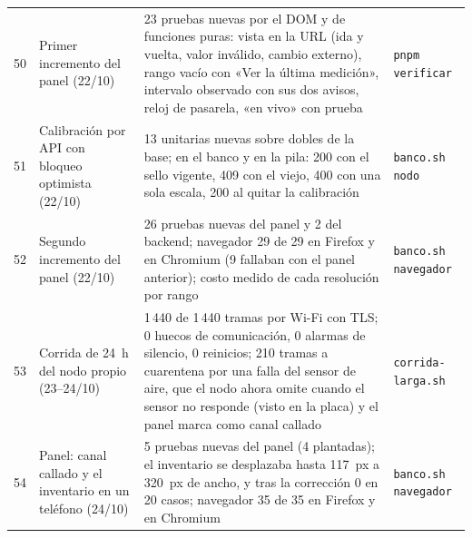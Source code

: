 \begin{longtable}{@{}L{0.8cm}L{3.2cm}L{4.2cm}L{3.8cm}@{}}
50 & Primer incremento del panel (22/10) & 23 pruebas nuevas por el DOM y de funciones puras: vista en la URL (ida y vuelta, valor inválido, cambio externo), rango vacío con «Ver la última medición», intervalo observado con sus dos avisos, reloj de pasarela, «en vivo» con prueba & \texttt{pnpm verificar} \\
51 & Calibración por API con bloqueo optimista (22/10) & 13 unitarias nuevas sobre dobles de la base; en el banco y en la pila: 200 con el sello vigente, 409 con el viejo, 400 con una sola escala, 200 al quitar la calibración & \texttt{banco.sh nodo} \\
52 & Segundo incremento del panel (22/10) & 26 pruebas nuevas del panel y 2 del backend; navegador 29 de 29 en Firefox y en Chromium (9 fallaban con el panel anterior); costo medido de cada resolución por rango & \texttt{banco.sh navegador} \\
53 & Corrida de 24~h del nodo propio (23--24/10) & 1\,440 de 1\,440 tramas por Wi-Fi con TLS; 0 huecos de comunicación, 0 alarmas de silencio, 0 reinicios; 210 tramas a cuarentena por una falla del sensor de aire, que el nodo ahora omite cuando el sensor no responde (visto en la placa) y el panel marca como canal callado & \texttt{corrida-larga.sh} \\
54 & Panel: canal callado y el inventario en un teléfono (24/10) & 5 pruebas nuevas del panel (4 plantadas); el inventario se desplazaba hasta 117~px a 320~px de ancho, y tras la corrección 0 en 20 casos; navegador 35 de 35 en Firefox y en Chromium & \texttt{banco.sh navegador} \\
\end{longtable}
